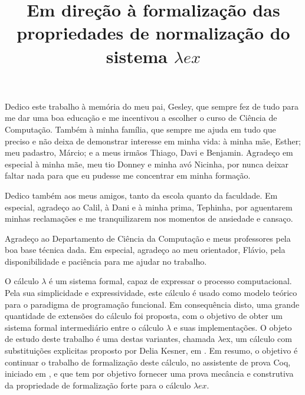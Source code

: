 \documentclass[bacharelado]{unb-cic}
\title{Em direção à formalização das propriedades de normalização do sistema
    $\lambda ex$}%
\begin{document}
  \maketitle
  \pretextual

  \begin{dedicatoria}
      Dedico este trabalho à memória do meu pai, Gesley, que sempre fez de tudo
      para me dar uma boa educação e me incentivou a escolher o curso de Ciência
      de Computação. Também à minha família, que sempre me ajuda em tudo que
      preciso e não deixa de demonstrar interesse em minha vida: à minha
      mãe, Esther; meu padastro, Márcio; e a meus irmãos Thiago, Davi e
      Benjamin. Agradeço em especial à minha mãe, meu tio Donney e minha avó
      Nicinha, por nunca deixar faltar nada para que eu pudesse me concentrar em
      minha formação.

      Dedico também aos meus amigos, tanto da escola quanto da faculdade. Em
      especial, agradeço ao Calil, à Dani e à minha prima, Tephinha, por
      aguentarem minhas reclamações e me tranquilizarem nos momentos de
      ansiedade e cansaço.
  \end{dedicatoria}

  \begin{agradecimentos}
      Agradeço ao Departamento de Ciência da Computação e meus professores pela
      boa base técnica dada. Em especial, agradeço ao meu orientador, Flávio,
      pela disponibilidade e paciência para me ajudar no trabalho.
  \end{agradecimentos}

  \begin{resumo}
    O cálculo $\lambda$ é um sistema formal, capaz de expressar o processo
    computacional.  Pela sua simplicidade e expressividade, este cálculo é usado
    como modelo teórico para o paradigma de programação funcional. Em consequência
    disto, uma grande quantidade de extensões do cálculo foi proposta, com o
    objetivo de obter um sistema formal intermediário entre o cálculo $\lambda$ e suas
    implementações.  O objeto de estudo deste trabalho é uma destas variantes,
    chamada $\lambda$ex, um cálculo com substituições explicitas proposto por Delia
    Kesner, em \cite{delia}.  Em resumo, o objetivo é continuar o trabalho de
    formalização deste cálculo, no assistente de prova Coq, iniciado em
    \cite{initial}, e que tem por objetivo fornecer uma prova mecância e
    construtiva da propriedade de formalização forte para o cálculo $\lambda
    ex$.
    \end{resumo}
\end{document}
